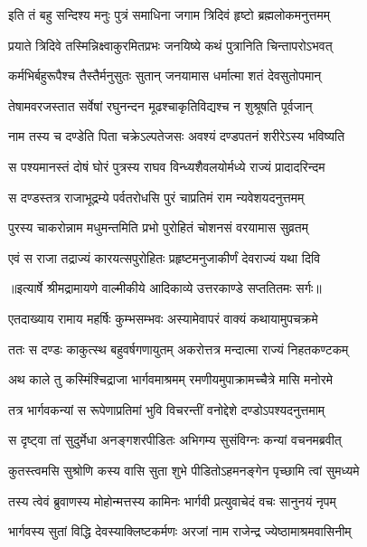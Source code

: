 \twolineshloka
{इति तं बहु सन्दिश्य मनुः पुत्रं समाधिना}
{जगाम त्रिदिवं हृष्टो ब्रह्मलोकमनुत्तमम्} %

\twolineshloka
{प्रयाते त्रिदिवे तस्मिन्निक्ष्वाकुरमितप्रभः}
{जनयिष्ये कथं पुत्रानिति चिन्तापरोऽभवत्} %

\twolineshloka
{कर्मभिर्बहुरूपैश्च तैस्तैर्मनुसुतः सुतान्}
{जनयामास धर्मात्मा शतं देवसुतोपमान्} %

\twolineshloka
{तेषामवरजस्तात सर्वेषां रघुनन्दन}
{मूढश्चाकृतिविद्यश्च न शुश्रूषति पूर्वजान्} %

\twolineshloka
{नाम तस्य च दण्डेति पिता चक्रेऽल्पतेजसः}
{अवश्यं दण्डपतनं शरीरेऽस्य भविष्यति} %

\twolineshloka
{स पश्यमानस्तं दोषं घोरं पुत्रस्य राघव}
{विन्ध्यशैवलयोर्मध्ये राज्यं प्रादादरिन्दम} %

\twolineshloka
{स दण्डस्तत्र राजाभूद्रम्ये पर्वतरोधसि}
{पुरं चाप्रतिमं राम न्यवेशयदनुत्तमम्} %

\twolineshloka
{पुरस्य चाकरोन्नाम मधुमन्तमिति प्रभो}
{पुरोहितं चोशनसं वरयामास सुव्रतम्} %

\twolineshloka
{एवं स राजा तद्राज्यं कारयत्सपुरोहितः}
{प्रहृष्टमनुजाकीर्णं देवराज्यं यथा दिवि} %


{॥इत्यार्षे श्रीमद्रामायणे वाल्मीकीये आदिकाव्ये उत्तरकाण्डे सप्ततितमः सर्गः॥}


\twolineshloka
{एतदाख्याय रामाय महर्षिः कुम्भसम्भवः}
{अस्यामेवापरं वाक्यं कथायामुपचक्रमे} %

\twolineshloka
{ततः स दण्डः काकुत्स्थ बहुवर्षगणायुतम्}
{अकरोत्तत्र मन्दात्मा राज्यं निहतकण्टकम्} %

\twolineshloka
{अथ काले तु कस्मिंश्चिद्राजा भार्गवमाश्रमम्}
{रमणीयमुपाक्रामच्चैत्रे मासि मनोरमे} %

\twolineshloka
{तत्र भार्गवकन्यां स रूपेणाप्रतिमां भुवि}
{विचरन्तीं वनोद्देशे दण्डोऽपश्यदनुत्तमाम्} %

\twolineshloka
{स दृष्ट्वा तां सुदुर्मेधा अनङ्गशरपीडितः}
{अभिगम्य सुसंविग्नः कन्यां वचनमब्रवीत्} %

\twolineshloka
{कुतस्त्वमसि सुश्रोणि कस्य वासि सुता शुभे}
{पीडितोऽहमनङ्गेन पृच्छामि त्वां सुमध्यमे} %

\twolineshloka
{तस्य त्वेवं ब्रुवाणस्य मोहोन्मत्तस्य कामिनः}
{भार्गवी प्रत्युवाचेदं वचः सानुनयं नृपम्} %

\twolineshloka
{भार्गवस्य सुतां विद्धि देवस्याक्लिष्टकर्मणः}
{अरजां नाम राजेन्द्र ज्येष्ठामाश्रमवासिनीम्} %

